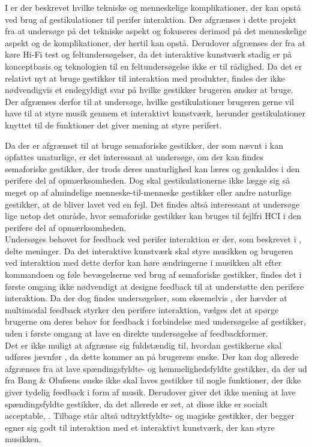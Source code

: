 I  er der beskrevet hvilke tekniske og menneskelige komplikationer, der kan opstå ved brug af gestikulationer til perifer interaktion. Der afgrænses i dette projekt fra at undersøge på det tekniske aspekt og fokuseres derimod på det menneskelige aspekt og de komplikationer, der hertil kan opstå. Derudover afgrænses der fra at køre Hi-Fi test og feltundersøgelser, da det interaktive kunstværk stadig er på konceptbasis og teknologien til en feltundersøgelse ikke er til rådighed. Da det er relativt nyt at bruge gestikker til interaktion med produkter, findes der ikke nødvendigvis et endegyldigt svar på hvilke gestikker brugeren ønsker at bruge. Der afgrænses derfor til at undersøge, hvilke gestikulationer brugeren gerne vil have til at styre musik gennem et interaktivt kunstværk, herunder gestikulationer knyttet til de funktioner det giver mening at styre perifert. 

Da der er afgrænset til at bruge semaforiske gestikker, der som nævnt i  kan opfattes unaturlige, er det interessant at undersøge, om der kan findes semaforiske gestikker, der trods deres unaturlighed kan læres og genkaldes i den perifere del af opmærksomheden. Dog skal gestikulationerne ikke lægge sig så meget op af almindelige menneske-til-menneske gestikker eller andre naturlige gestikker, at de bliver lavet ved en fejl. Det findes altså interessant at undersøge lige netop det område, hvor semaforiske gestikker kan bruges til fejlfri HCI i den perifere del af opmærksomheden. \\

Undersøges behovet for feedback ved perifer interaktion er der, som beskrevet i , delte meninger. Da det interaktive kunstværk skal styre musikken og brugeren ved interaktion med dette derfor kan høre ændringerne i musikken alt efter kommandoen og føle bevægelserne ved brug af semaforiske gestikker, findes det i første omgang ikke nødvendigt at designe feedback til at understøtte den perifere interaktion. Da der dog findes undersøgelser, som eksemelvis \textcite[s. 21]{PDF:FacilitatingPIDesignAndEvaluation}, der hævder at multimodal feedback styrker den perifere interaktion, vælges det at spørge brugerne om deres behov for feedback i forbindelse med undersøgelse af gestikker, uden i første omgang at lave en direkte undersøgelse af feedbackformer. \\

Det er ikke muligt at afgrænse sig fuldstændig til, hvordan gestikkerne skal udføres jævnfør , da dette kommer an på brugerens ønske. Der kan dog allerede afgrænses fra at lave spændingsfyldte- og hemmelighedsfyldte gestikker, da der ud fra Bang $\&$ Olufsens ønske ikke skal laves gestikker til nogle funktioner, der ikke giver tydelig feedback i form af musik. Derudover giver det ikke mening at lave spændingsfyldte gestikker, da det allerede er set, at disse ikke er socialt acceptable, \parencite[s. 277]{PDF:WouldYouDoThat}. Tilbage står altså udtryktfyldte- og magiske gestikker, der begger egner sig godt til interaktion med et interaktivt kunstværk, der kan styre musikken. \\

